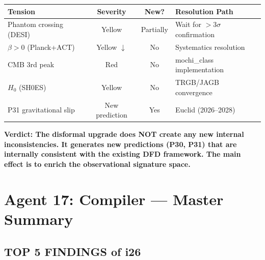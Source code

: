 \documentclass[11pt,a4paper]{article}
\begin{document}
\begin{center}
\begin{tabular}{lccl}
\toprule
\textbf{Tension} & \textbf{Severity} & \textbf{New?} & \textbf{Resolution Path} \\
\midrule
Phantom crossing (DESI) & Yellow & Partially & Wait for $>$3$\sigma$ confirmation \\
$\beta > 0$ (Planck+ACT) & Yellow $\downarrow$ & No & Systematics resolution \\
CMB 3rd peak & Red & No & mochi\_class implementation \\
$H_0$ (SH0ES) & Yellow & No & TRGB/JAGB convergence \\
P31 gravitational slip & New prediction & Yes & Euclid (2026--2028) \\
\bottomrule
\end{tabular}
\end{center}

\textbf{Verdict: The disformal upgrade does NOT create any new internal inconsistencies. It generates new predictions (P30, P31) that are internally consistent with the existing DFD framework. The main effect is to enrich the observational signature space.}

\section{Agent 17: Compiler --- Master Summary}

\subsection{TOP 5 FINDINGS of i26}
\end{document}
